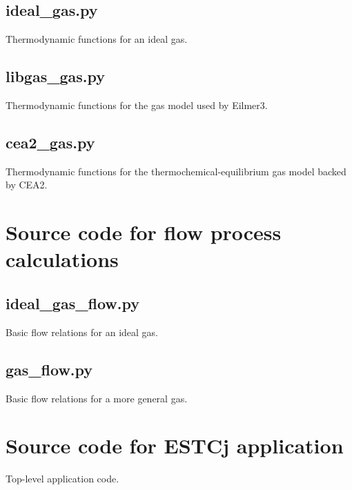 \documentclass[landscape,12pt,a4paper]{article}
\begin{document}
\subsection{ideal\_gas.py}
\label{ideal-gas-py}
%
Thermodynamic functions for an ideal gas.



\newpage
\subsection{libgas\_gas.py}
\label{libgas-gas-py}
%
Thermodynamic functions for the gas model used by Eilmer3.



\newpage
\subsection{cea2\_gas.py}
\label{cea2-gas-py}
%
Thermodynamic functions for the thermochemical-equilibrium gas model backed by CEA2.



\newpage
\section{Source code for flow process calculations}
\label{process-code-sec}
%
\subsection{ideal\_gas\_flow.py}
\label{ideal-gas-flow-py}
%
Basic flow relations for an ideal gas.



\newpage
\subsection{gas\_flow.py}
\label{gas-flow-py}
%
Basic flow relations for a more general gas.



\newpage
\section{Source code for ESTCj application}
\label{estcj-py}
%
Top-level application code.
\end{document}
